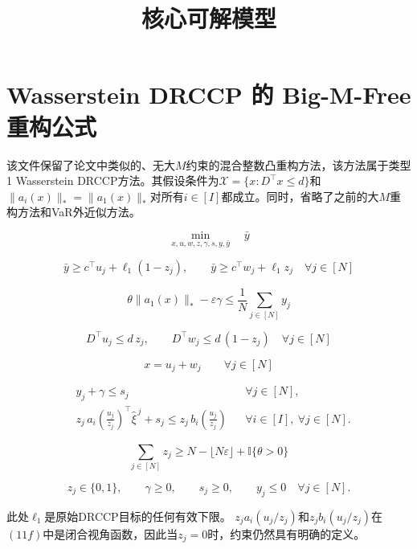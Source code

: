 \documentclass[11pt,a4paper]{article}
\title{核心可解模型}
\author{}
\date{}
\begin{document}
\maketitle

\section*{Wasserstein DRCCP 的 Big-M-Free 重构公式}
该文件保留了论文中类似的、无大\(M\)约束的混合整数凸重构方法，该方法属于类型1 Wasserstein DRCCP方法。其假设条件为\(\mathcal{X}=\{x: D^\top x \le d\}\)和\(\|a_i(x)\|_* = \|a_1(x)\|_*\)对所有\(i\in[I]\)都成立。同时，省略了之前的大\(M\)重构方法和VaR外近似方法。

\begin{equation}
\min_{x,u,w,z,\gamma,s,y,\bar y}\quad \bar y
\tag{11a}
\end{equation}

\begin{equation}
\bar y \ge c^\top u_j + \ell_1(1-z_j),
\qquad
\bar y \ge c^\top w_j + \ell_1 z_j
\quad \forall j\in[N]
\tag{11b}
\end{equation}

\begin{equation}
\theta \|a_1(x)\|_* - \varepsilon \gamma
\le
\frac{1}{N}\sum_{j\in[N]} y_j
\tag{11c}
\end{equation}

\begin{equation}
D^\top u_j \le d\,z_j,\qquad
D^\top w_j \le d\,(1-z_j)
\quad \forall j\in[N]
\tag{11d}
\end{equation}

\begin{equation}
x = u_j + w_j
\qquad \forall j\in[N]
\tag{11e}
\end{equation}

\begin{equation}
\begin{aligned}
& y_j + \gamma \le s_j
&& \forall j\in[N], \\
& z_j\, a_i\!\left(\frac{u_j}{z_j}\right)^\top \hat\xi^{\,j} + s_j
\le
z_j\, b_i\!\left(\frac{u_j}{z_j}\right)
&& \forall i\in[I],\ \forall j\in[N].
\end{aligned}
\tag{11f}
\end{equation}

\begin{equation}
\sum_{j\in[N]} z_j \ge N-\lfloor N\varepsilon \rfloor + \mathbb{I}\{\theta>0\}
\tag{11g}
\end{equation}

\begin{equation}
z_j\in\{0,1\},\qquad
\gamma \ge 0,\qquad
s_j \ge 0,\qquad
y_j \le 0
\quad \forall j\in[N].
\tag{11h}
\end{equation}

\noindent
此处\(\ell_1\)是原始DRCCP目标的任何有效下限。 \(
z_j a_i(u_j/z_j)
\)和\(
z_j b_i(u_j/z_j)
\)在\((11f)\)中是闭合视角函数，因此当\(z_j=0\)时，约束仍然具有明确的定义。
\end{document}
